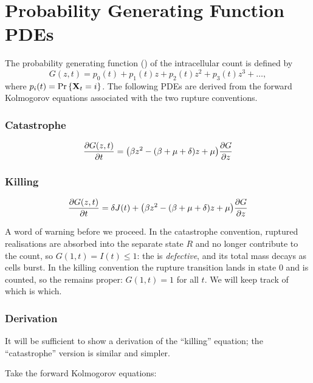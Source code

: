 \section{Probability Generating Function PDEs}
\label{sec:pgf-pdes}

The probability generating function (\pgf) of the intracellular count is
defined by
$$G(z,t) = p_0(t) + p_1(t)z + p_2(t)z^2 + p_3(t)z^3 + \dots,$$
where $p_i(t)={\text{Pr}\left\{{{\bf X}_t}=i\right\}}$. The following PDEs are derived from the forward
Kolmogorov equations associated with the two rupture conventions.

\subsubsection*{Catastrophe}

\begin{equation}
\label{catEq1}
\displaystyle\frac{\partial G(z,t)}{\partial t} = \big(\beta z^2 - (\beta + \mu + \delta)z + \mu\big)\displaystyle\frac{\partial G}{\partial z}
\end{equation}

\subsubsection*{Killing}

\begin{equation}
\displaystyle\frac{\partial G(z,t)}{\partial t} = \delta J(t) +  \big(\beta z^2 - (\beta + \mu + \delta)z + \mu\big)\displaystyle\frac{\partial G}{\partial z}
\label{killEq1}
\end{equation}

A word of warning before we proceed. In the catastrophe convention, ruptured
realisations are absorbed into the separate state $R$ and no longer
contribute to the count, so $G(1,t)=I(t)\le1$: the \pgf{} is
\emph{defective}, and its total mass decays as cells burst. In the killing
convention the rupture transition lands in state $0$ and is counted, so the
\pgf{} remains proper: $G(1,t)=1$ for all $t$. We will keep track of which
is which.

\subsubsection*{Derivation}

It will be sufficient to show a derivation of the ``killing'' equation; the
``catastrophe'' version is similar and simpler. \par

Take the forward Kolmogorov equations:

